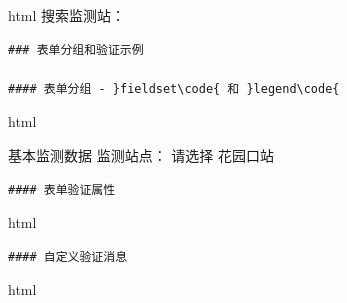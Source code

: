 html 搜索监测站：

\begin{lstlisting}
### 表单分组和验证示例

#### 表单分组 - }fieldset\code{ 和 }legend\code{

\end{lstlisting}

html

基本监测数据 监测站点： 请选择 花园口站

\begin{lstlisting}
#### 表单验证属性

\end{lstlisting}

html

\begin{lstlisting}
#### 自定义验证消息

\end{lstlisting}

html

